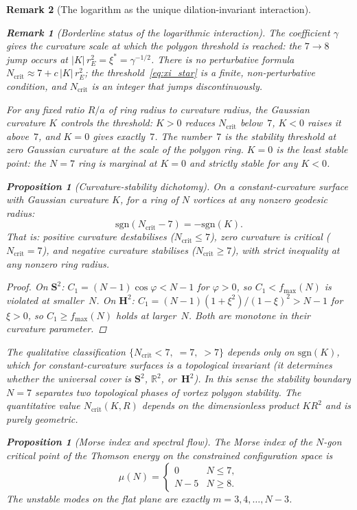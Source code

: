 \documentclass[12pt, a4paper]{article}
\newtheorem{proposition}[theorem]{Proposition}
\newtheorem{remark}{Remark}[section]
\numberwithin{equation}{section}
\begin{document}
\begin{remark}[The logarithm as the unique dilation-invariant interaction]
\begin{remark}[Borderline status of the logarithmic interaction]
The coefficient $\gamma$ gives the curvature scale at which the polygon threshold is reached:
the $7\to 8$ jump occurs at $|K|\,r_E^2 = \xi^* = \gamma^{-1/2}$.
There is no perturbative formula $N_\mathrm{crit} \approx 7 + c\,|K|\,r_E^2$;
the threshold~\eqref{eq:xi_star} is a \emph{finite}, non-perturbative
condition, and $N_\mathrm{crit}$ is an integer that jumps discontinuously.

For any fixed ratio $R/a$ of ring radius to curvature radius, the
Gaussian curvature $K$ controls the threshold: $K > 0$ reduces
$N_{\mathrm{crit}}$ below~$7$, $K < 0$ raises it above~$7$, and
$K = 0$ gives exactly~$7$.  The number~$7$ is the stability threshold
at zero Gaussian curvature \emph{at the scale of the polygon ring}.
$K=0$ is the \emph{least stable point}: the $N=7$ ring is marginal
at $K=0$ and strictly stable for any $K<0$.

\begin{proposition}[Curvature-stability dichotomy]
\label{prop:curvature-dichotomy}
On a constant-curvature surface with Gaussian curvature $K$,
for a ring of $N$ vortices at any nonzero geodesic radius:
\[
  \mathrm{sgn}(N_{\mathrm{crit}} - 7) = -\mathrm{sgn}(K).
\]
That is: positive curvature destabilises
($N_{\mathrm{crit}} \le 7$), zero curvature is critical
($N_{\mathrm{crit}} = 7$), and negative curvature stabilises
($N_{\mathrm{crit}} \ge 7$), with strict inequality at any
nonzero ring radius.
\end{proposition}

\begin{proof}
On $\mathbf{S}^2$: $C_1 = (N{-}1)\cos\varphi < N{-}1$ for
$\varphi > 0$, so $C_1 < f_{\max}(N)$ is violated at smaller~$N$.
On $\mathbf{H}^2$: $C_1 = (N{-}1)(1{+}\xi^2)/(1{-}\xi)^2 > N{-}1$
for $\xi > 0$, so $C_1 \ge f_{\max}(N)$ holds at larger~$N$.
Both are monotone in their curvature parameter.
\end{proof}

The \emph{qualitative} classification
$\{N_{\mathrm{crit}} < 7,\; = 7,\; > 7\}$ depends only on
$\mathrm{sgn}(K)$, which for constant-curvature surfaces is a
topological invariant (it determines whether the universal cover
is $\mathbf{S}^2$, $\mathbb{R}^2$, or~$\mathbf{H}^2$).
In this sense the stability boundary $N = 7$ separates two
\emph{topological phases} of vortex polygon stability.
The \emph{quantitative} value $N_{\mathrm{crit}}(K, R)$ depends
on the dimensionless product $K R^2$ and is purely geometric.
\begin{proposition}[Morse index and spectral flow]
\label{prop:morse-index}
The Morse index of the $N$-gon critical point of the Thomson energy
on the constrained configuration space is
\[
  \mu(N) = \begin{cases} 0 & N \le 7, \\ N - 5 & N \ge 8. \end{cases}
\]
The unstable modes on the flat plane are exactly $m = 3, 4, \ldots, N{-}3$.
\end{proposition}


\end{remark}
\end{remark}
\end{document}
